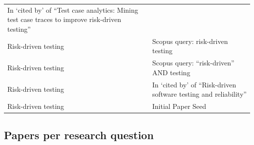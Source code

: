 \documentclass[]{book}
\begin{document}
\begin{longtable}[]{@{}lll@{}}
\begin{minipage}[t]{0.32\columnwidth}
In `cited by' of ``Test case analytics: Mining test case traces to
improve risk-driven testing''\strut
\end{minipage}\tabularnewline
\begin{minipage}[t]{0.19\columnwidth}\raggedright\strut
Risk-driven testing\strut
\end{minipage} & \begin{minipage}[t]{0.41\columnwidth}\raggedright\strut
\citet{schneidewind2007}\strut
\end{minipage} & \begin{minipage}[t]{0.32\columnwidth}\raggedright\strut
Scopus query: risk-driven testing\strut
\end{minipage}\tabularnewline
\begin{minipage}[t]{0.19\columnwidth}\raggedright\strut
Risk-driven testing\strut
\end{minipage} & \begin{minipage}[t]{0.41\columnwidth}\raggedright\strut
\citet{vernotte2015}\strut
\end{minipage} & \begin{minipage}[t]{0.32\columnwidth}\raggedright\strut
Scopus query: ``risk-driven'' AND testing\strut
\end{minipage}\tabularnewline
\begin{minipage}[t]{0.19\columnwidth}\raggedright\strut
Risk-driven testing\strut
\end{minipage} & \begin{minipage}[t]{0.41\columnwidth}\raggedright\strut
\citet{atifi2017}\strut
\end{minipage} & \begin{minipage}[t]{0.32\columnwidth}\raggedright\strut
In `cited by' of ``Risk-driven software testing and reliability''\strut
\end{minipage}\tabularnewline
\begin{minipage}[t]{0.19\columnwidth}\raggedright\strut
Risk-driven testing\strut
\end{minipage} & \begin{minipage}[t]{0.41\columnwidth}\raggedright\strut
\citet{noor2015test}\strut
\end{minipage} & \begin{minipage}[t]{0.32\columnwidth}\raggedright\strut
Initial Paper Seed\strut
\end{minipage}\tabularnewline
\bottomrule
\end{longtable}

\subsection{Papers per research
question}\label{papers-per-research-question}
\end{document}

